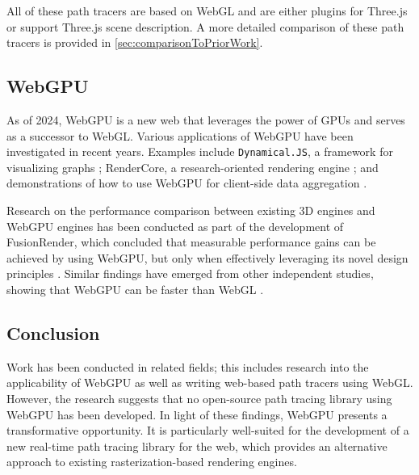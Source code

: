 All of these path tracers are based on \gls{WebGL} and are either plugins for \gls{Three.js} or support \gls{Three.js} scene description. A more detailed comparison of these path tracers is provided in \autoref{sec:comparisonToPriorWork}.

\subsection*{WebGPU}

As of 2024, \gls{WebGPU} is a new web  that leverages the power of \glspl{GPU} and serves as a successor to \gls{WebGL}. Various applications of \gls{WebGPU} have been investigated in recent years. Examples include \texttt{Dynamical.JS}, a framework for visualizing graphs \cite{dotson2022dynamicaljs}; RenderCore, a research-oriented rendering engine \cite{Bohak_Kovalskyi_Linev_Mrak_Tadel_Strban_Tadel_Yagil_2024}; and demonstrations of how to use \gls{WebGPU} for client-side data aggregation \cite{kimmersdorfer2023webgpu}.

Research on the performance comparison between existing 3D engines and \gls{WebGPU} engines has been conducted as part of the development of FusionRender, which concluded that measurable performance gains can be achieved by using \gls{WebGPU}, but only when effectively leveraging its novel design principles \cite{fusionRenderWebGPU}. Similar findings have emerged from other independent studies, showing that \gls{WebGPU} can be faster than \gls{WebGL} \cite{webGPUWebGis, fransson2023performance, CHICKERUR2024919}.

\subsection*{Conclusion}

Work has been conducted in related fields; this includes research into the applicability of \gls{WebGPU} as well as writing web-based path tracers using \gls{WebGL}. However, the research suggests that no open-source path tracing library using \gls{WebGPU} has been developed. In light of these findings, \gls{WebGPU} presents a transformative opportunity. It is particularly well-suited for the development of a new real-time path tracing library for the web, which provides an alternative approach to existing rasterization-based rendering engines.
